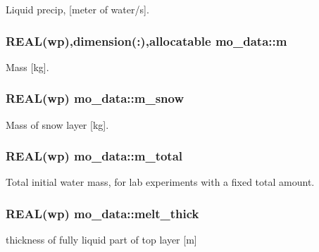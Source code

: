 Liquid precip, \mbox{[}meter of water/s\mbox{]}. 

\hypertarget{namespacemo__data_af1813881649730f758278713d7d72d18}{
\subsubsection[{m}]{\setlength{\rightskip}{0pt plus 5cm}REAL(wp),dimension(:),allocatable {\bf mo\_\-data::m}}}
\label{namespacemo__data_af1813881649730f758278713d7d72d18}


Mass \mbox{[}kg\mbox{]}. 

\hypertarget{namespacemo__data_abda43178412f35b4871bbfe89bc3eb12}{
\subsubsection[{m\_\-snow}]{\setlength{\rightskip}{0pt plus 5cm}REAL(wp) {\bf mo\_\-data::m\_\-snow}}}
\label{namespacemo__data_abda43178412f35b4871bbfe89bc3eb12}


Mass of snow layer \mbox{[}kg\mbox{]}. 

\hypertarget{namespacemo__data_a075b7537738c70f4bc97adf551be3b75}{
\subsubsection[{m\_\-total}]{\setlength{\rightskip}{0pt plus 5cm}REAL(wp) {\bf mo\_\-data::m\_\-total}}}
\label{namespacemo__data_a075b7537738c70f4bc97adf551be3b75}


Total initial water mass, for lab experiments with a fixed total amount. 

\hypertarget{namespacemo__data_ae1057f6ef957e6cae0ac381add3f3b73}{
\subsubsection[{melt\_\-thick}]{\setlength{\rightskip}{0pt plus 5cm}REAL(wp) {\bf mo\_\-data::melt\_\-thick}}}
\label{namespacemo__data_ae1057f6ef957e6cae0ac381add3f3b73}


thickness of fully liquid part of top layer \mbox{[}m\mbox{]} 

